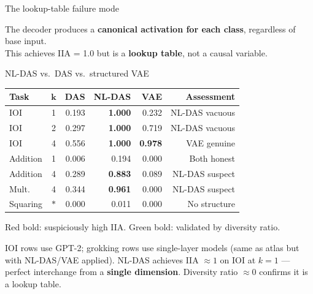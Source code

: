 \documentclass[aspectratio=169,11pt]{beamer}
\begin{document}
\begin{frame}{The lookup-table failure mode}
\begin{center}
\end{center}

\vspace{0.2em}
\begin{center}
{\small The decoder produces a \textbf{canonical activation for each class}, regardless of base input.\\This achieves IIA = 1.0 but is a \textbf{lookup table}, not a causal variable.}
\end{center}
\end{frame}

\begin{frame}{NL-DAS vs.\ DAS vs.\ structured VAE}

\centering
{\small\setlength{\tabcolsep}{4pt}
\begin{tabular}{lc rrrr}
\toprule
\textbf{Task} & $\boldsymbol{k}$ & \textbf{DAS} & \textbf{NL-DAS} & \textbf{VAE} & \textbf{Assessment} \\
\midrule
IOI & 1 & 0.193 & \textcolor{fail}{\textbf{1.000}} & 0.232 & NL-DAS vacuous \\
IOI & 2 & 0.297 & \textcolor{fail}{\textbf{1.000}} & 0.719 & NL-DAS vacuous \\
IOI & 4 & 0.556 & \textcolor{fail}{\textbf{1.000}} & \textcolor{pass}{\textbf{0.978}} & VAE genuine \\
Addition & 1 & 0.006 & 0.194 & 0.000 & Both honest \\
Addition & 4 & 0.289 & \textcolor{fail}{\textbf{0.883}} & 0.089 & NL-DAS suspect \\
Mult. & 4 & 0.344 & \textcolor{fail}{\textbf{0.961}} & 0.000 & NL-DAS suspect \\
Squaring & $*$ & 0.000 & 0.011 & 0.000 & No structure \\
\bottomrule
\end{tabular}}

\vspace{0.5em}
{\small \textcolor{fail}{Red bold}: suspiciously high IIA. \textcolor{pass}{Green bold}: validated by diversity ratio.}

\vspace{0.3em}
{\small IOI rows use GPT-2; grokking rows use single-layer models (same as atlas but with NL-DAS/VAE applied). NL-DAS achieves IIA $\approx 1$ on IOI at $k=1$ --- perfect interchange from a \textbf{single dimension}. Diversity ratio $\approx 0$ confirms it is a lookup table.}
\end{frame}
\end{document}
